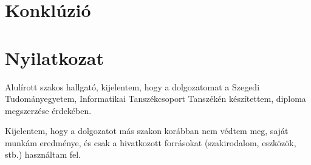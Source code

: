\documentclass[12pt]{report}
\theoremstyle{definition}
\begin{document}

\chapter{Konklúzió}



\begin{thebibliography}{9}

\end{thebibliography}



\chapter*{Nyilatkozat}




\noindent
Alulírott \makebox[4cm]{\dotfill} szakos hallgató, kijelentem, hogy a dolgozatomat a Szegedi Tudományegyetem, Informatikai Tanszékcsoport \makebox[4cm]{\dotfill} Tanszékén készítettem, \makebox[4cm]{\dotfill} diploma megszerzése érdekében.

Kijelentem, hogy a dolgozatot más szakon korábban nem védtem meg, saját munkám eredménye, és csak a hivatkozott forrásokat (szakirodalom, eszközök, stb.) használtam fel.
\end{document}
